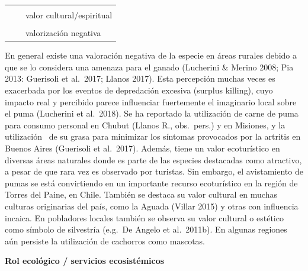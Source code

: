 \documentclass[
  x11names]{article}
\begin{document}
\begin{tabu} to 
\toprule
\textbf{} &  & \\
\textbf{} &  & valor cultural/espiritual\\
\textbf{} &  & \\
\textbf{} &  & valorización negativa\\
\bottomrule
\end{tabu}

En general existe una valoración negativa de la especie en áreas rurales
debido a que se lo considera una amenaza para el ganado (Lucherini \&
Merino 2008; Pia 2013: Guerisoli et al.~2017; Llanos 2017). Esta
percepción muchas veces es exacerbada por los eventos de depredación
excesiva (surplus killing), cuyo impacto real y percibido parece
influenciar fuertemente el imaginario local sobre el puma (Lucherini et
al.~2018). Se ha reportado la utilización de carne de puma para consumo
personal en Chubut (Llanos R., obs.~pers.) y en Misiones, y la
utilización~ de su grasa para minimizar los síntomas provocados por la
artritis en Buenos Aires (Guerisoli et al.~2017). Además, tiene un valor
ecoturístico en diversas áreas naturales donde es parte de las especies
destacadas como atractivo, a pesar de que rara vez es observado por
turistas. Sin embargo, el avistamiento de pumas se está convirtiendo en
un importante recurso ecoturístico en la región de Torres del Paine, en
Chile. También se destaca su valor cultural en muchas culturas
originarias del país, como la Aguada (Villar 2015) y otras con
influencia incaica. En pobladores locales también se observa su valor
cultural o estético como símbolo de silvestría (e.g.~De Angelo et
al.~2011b). En algunas regiones aún persiste la utilización de cachorros
como mascotas.

\textbf{Rol ecológico / servicios ecosistémicos}
\end{document}
